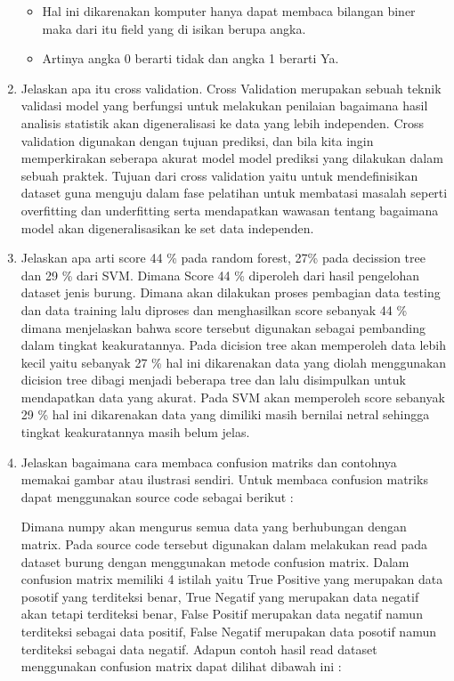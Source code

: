 \begin{enumerate}
\begin{itemize}
		\item Hal ini dikarenakan komputer hanya dapat membaca bilangan biner maka dari itu field yang di isikan berupa angka.

		\item Artinya angka 0 berarti tidak dan angka 1 berarti Ya.
	\end{itemize}
	
	\item Jelaskan apa itu cross validation.
	\hfill\break
	Cross Validation merupakan sebuah teknik validasi model yang berfungsi untuk melakukan penilaian bagaimana hasil analisis statistik akan digeneralisasi ke data yang lebih independen. Cross validation digunakan dengan tujuan prediksi, dan bila kita ingin memperkirakan seberapa akurat model model prediksi yang dilakukan dalam sebuah praktek. Tujuan dari cross validation yaitu untuk mendefinisikan dataset guna menguju dalam fase pelatihan untuk membatasi masalah seperti overfitting dan underfitting serta mendapatkan wawasan tentang bagaimana model akan digeneralisasikan ke set data independen.

	\item Jelaskan apa arti score 44 \% pada random forest, 27\% pada decission tree dan 29 \% dari SVM.
	\hfill\break
	Dimana Score 44 \% diperoleh dari hasil pengelohan dataset jenis burung. Dimana akan dilakukan proses pembagian data testing dan data training lalu diproses dan menghasilkan score sebanyak 44 \% dimana menjelaskan bahwa score tersebut digunakan sebagai pembanding dalam tingkat keakuratannya. Pada dicision tree akan memperoleh data lebih kecil yaitu sebanyak 27 \% hal ini dikarenakan data yang diolah menggunakan dicision tree dibagi menjadi beberapa tree dan lalu disimpulkan untuk mendapatkan data yang akurat. Pada SVM akan memperoleh score sebanyak 29 \% hal ini dikarenakan data yang dimiliki masih bernilai netral sehingga tingkat keakuratannya masih belum jelas.

	\item Jelaskan bagaimana cara membaca confusion matriks dan contohnya memakai gambar atau ilustrasi sendiri.
	\hfill\break
	Untuk membaca confusion matriks dapat menggunakan source code sebagai berikut :
	
	\hfill\break
	Dimana numpy akan mengurus semua data yang berhubungan dengan matrix. Pada source code tersebut digunakan dalam melakukan read pada dataset burung dengan menggunakan metode confusion matrix. Dalam confusion matrix memiliki 4 istilah yaitu True Positive yang merupakan data posotif yang terditeksi benar, True Negatif yang merupakan data negatif akan tetapi terditeksi benar, False Positif merupakan data negatif namun terditeksi sebagai data positif, False Negatif merupakan data posotif namun terditeksi sebagai data negatif. Adapun contoh hasil read dataset menggunakan confusion matrix dapat dilihat dibawah ini :


\end{enumerate}
